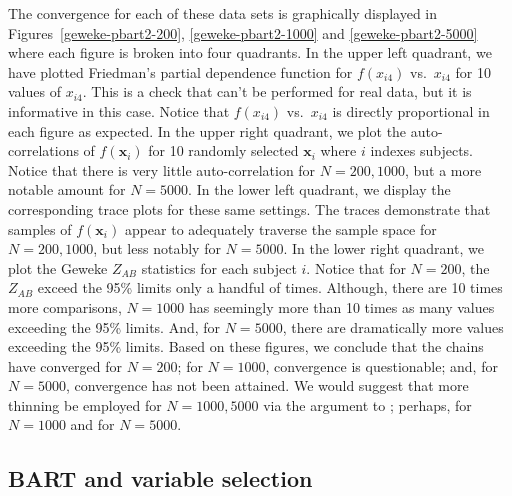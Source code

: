 \documentclass[article]{jss}
\begin{document}
The convergence for each of these data sets is graphically displayed
in Figures~\ref{geweke-pbart2-200}, \ref{geweke-pbart2-1000} and
\ref{geweke-pbart2-5000} where each figure is broken into four
quadrants.  In the upper left quadrant, we have plotted Friedman's
partial dependence function for $f(x_{i4})$ vs.\ $x_{i4}$ for 10 values of
$x_{i4}$.  This is a check that can't be performed for real data, but it
is informative in this case.  Notice that $f(x_{i4})$ vs.\ $x_{i4}$ is
directly proportional in each figure as expected.  In the upper right
quadrant, we plot the auto-correlations of $f(\bm{x}_i)$ for 10
randomly selected $\bm{x}_i$ where $i$ indexes subjects.  Notice that
there is very little auto-correlation for $N=200, 1000$, but a more
notable amount for $N=5000$.  In the lower left quadrant, we display
the corresponding trace plots for these same settings.  The traces
demonstrate that samples of $f(\bm{x}_i)$ appear to adequately
traverse the sample space for $N=200, 1000$, but less notably for
$N=5000$.  In the lower right quadrant, we plot the Geweke $Z_{AB}$
statistics for each subject $i$.  Notice that for $N=200$, the
$Z_{AB}$ exceed the 95\% limits only a handful of times.  Although,
there are 10 times more comparisons, $N=1000$ has seemingly more than
10 times as many values exceeding the 95\% limits.  And, for
$N=5000$, there are dramatically more values exceeding the 95\%
limits.  Based on these figures, we conclude that the chains have
converged for $N=200$; for $N=1000$, convergence is questionable; and,
for $N=5000$, convergence has not been attained.  We would suggest
that more thinning be employed for $N=1000, 5000$ via the
 argument to ; perhaps,
 for $N=1000$ and  for
$N=5000$.

\subsection{BART and variable selection}
\end{document}
